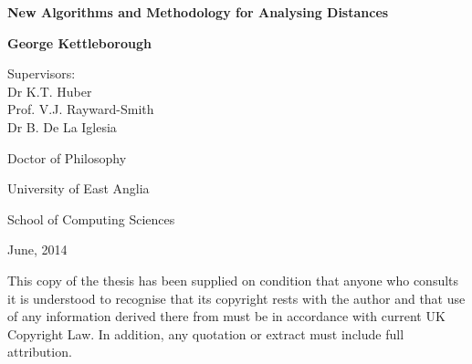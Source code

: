 \documentclass[a4paper,11pt,oneside,final]{book}
\title{\reporttitle}
\author{\reportauthor}
\newcommand{\reporttitle}{New Algorithms and Methodology for Analysing
  Distances}
\newcommand{\reportauthor}{George Kettleborough}
\newcommand{\0}{{\emptyset}}
\begin{document}

\setcounter{page}{1}

\begin{titlepage}
\begin{center}
\vspace*{0.4in}
{\Huge\bfseries\sffamily\reporttitle\par}
\vspace{.7in}
{\large\bfseries\sffamily\reportauthor\par}
\par
\vspace{0.3in}
{ Supervisors:\\
Dr K.T. Huber\\
Prof. V.J. Rayward-Smith\\
Dr B. De La Iglesia}
\par
\vspace{0.4in}
Doctor of Philosophy\\
\par
\vspace{0.4in}
University of East Anglia
\par
\vspace{0.4in}
School of Computing Sciences\\
\par
\vspace{0.3in}
June, 2014
\par
\vspace{0.3in}
\par
\vspace{0.3in}
{\small This copy of the thesis has been supplied on condition
  that anyone who consults it is understood to recognise that its copyright
  rests with the author and that use of any information derived there from
  must be in accordance with current UK Copyright Law. In addition, any
  quotation or extract must include full attribution.}
\end{center}
\end{titlepage}


\newpage

\setcounter{page}{2}



\newpage

%
\tableofcontents
\newpage
\end{document}

